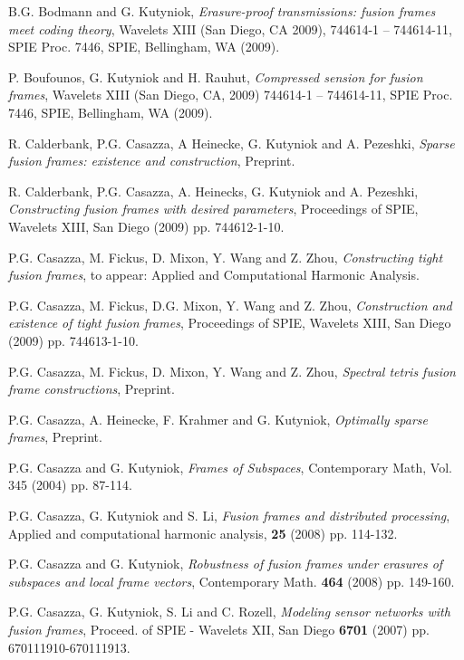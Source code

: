 \documentclass[11pt,reqno]{amsart}
\theoremstyle{remark}
\begin{document}
\begin{thebibliography}{WW}

  B.G. Bodmann and G. Kutyniok, {\it Erasure-proof transmissions:
fusion frames meet coding theory}, Wavelets XIII (San Diego, CA 2009), 744614-1 -- 744614-11,
SPIE Proc. 7446, SPIE, Bellingham, WA (2009).

  P. Boufounos, G. Kutyniok and H. Rauhut, {\it Compressed sension
for fusion frames}, Wavelets XIII (San Diego, CA, 2009) 744614-1 -- 744614-11,
SPIE Proc. 7446, SPIE, Bellingham, WA (2009).

  R. Calderbank, P.G. Casazza, A Heinecke, G. Kutyniok and A. Pezeshki,
{\it Sparse fusion frames:  existence and construction}, Preprint.

  R. Calderbank, P.G. Casazza, A. Heinecks, G. Kutyniok and A. Pezeshki,
{\it Constructing fusion frames with desired parameters},
Proceedings of SPIE, Wavelets XIII, San Diego (2009) pp.  744612-1-10.

  P.G. Casazza, M. Fickus, D. Mixon, Y. Wang and Z. Zhou,
{\it Constructing tight fusion frames}, to appear:  Applied and Computational
Harmonic Analysis.

  P.G. Casazza, M. Fickus, D.G. Mixon, Y. Wang and Z. Zhou,
{\it Construction and existence of tight fusion frames}, Proceedings of
SPIE, Wavelets XIII, San Diego (2009) pp.  744613-1-10.

  P.G. Casazza, M. Fickus, D. Mixon, Y. Wang and Z. Zhou,
{\it Spectral tetris fusion frame constructions}, Preprint.

  P.G. Casazza, A. Heinecke, F. Krahmer and G. Kutyniok,
{\it Optimally sparse frames}, Preprint.

  P.G. Casazza and G. Kutyniok, {\it Frames of Subspaces},
Contemporary Math, Vol. 345 (2004) pp. 87-114.

  P.G. Casazza,  G. Kutyniok and S. Li, {\it Fusion frames and
distributed processing},
Applied and computational harmonic analysis, {\bf 25} (2008) pp. 114-132.

  P.G. Casazza and G. Kutyniok, {\it Robustness of fusion frames under erasures of subspaces and local frame vectors}, Contemporary Math.
{\bf 464} (2008) pp. 149-160.

  P.G. Casazza, G. Kutyniok, S. Li and C. Rozell, {\it Modeling sensor networks with fusion frames},
Proceed. of SPIE - Wavelets XII, San Diego {\bf 6701}
(2007) pp. 670111910-670111913.


\end{thebibliography}
\end{document}
